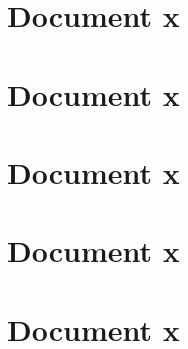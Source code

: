 
\section{Document x}

\section{Document x}

\section{Document x}

\section{Document x}

\section{Document x}